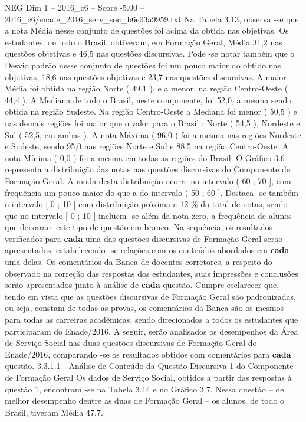 \begin{textsample}{NEG Dim 1 – 2016\_c6 – Score -5.00 – 2016\_c6/enade\_2016\_serv\_soc\_b6e03a9959.txt}
Na Tabela 3.13, observa -se que a nota Média nesse conjunto de questões foi acima da obtida nas objetivas.
Os estudantes, de todo o Brasil, obtiveram, em Formação Geral, Média 31,2 nas questões objetivas e 46,5 nas questões discursivas.
Pode -se notar também que o Desvio padrão nesse conjunto de questões foi um pouco maior do obtido nas objetivas, 18,6 nas questões objetivas e 23,7 nas questões discursivas.
A maior Média foi obtida na região Norte ( 49,1 ), e a menor, na região Centro-Oeste ( 44,4 ).
A Mediana de todo o Brasil, neste componente, foi 52,0, a mesma sendo obtida na região Sudeste.
Na região Centro-Oeste a Mediana foi menor ( 50,5 ) e nas demais regiões foi maior que o valor para o Brasil : Norte ( 54,5 ), Nordeste e Sul ( 52,5, em ambas ).
A nota Máxima ( 96,0 ) foi a mesma nas regiões Nordeste e Sudeste, sendo 95,0 nas regiões Norte e Sul e 88,5 na região Centro-Oeste.
A nota Mínima ( 0,0 ) foi a mesma em todas as regiões do Brasil.
O Gráfico 3.6 representa a distribuição das notas nas questões discursivas do Componente de Formação Geral.
A moda desta distribuição ocorre no intervalo ( 60 ; 70 ], com frequência um pouco maior do que a do intervalo ( 50 ; 60 ].
Destaca -se também o intervalo [ 0 ; 10 ] com distribuição próxima a 12 \% do total de notas, sendo que no intervalo [ 0 ; 10 ] incluem -se além da nota zero, a frequência de alunos que deixaram este tipo de questão em branco.
Na sequência, os resultados verificados para \textbf{cada} uma das questões discursivas de Formação Geral serão apresentados, estabelecendo -se relações com os conteúdos abordados em \textbf{cada} uma delas.
Os comentários da Banca de docentes corretores, a respeito do observado na correção das respostas dos estudantes, suas impressões e conclusões serão apresentados junto à análise de \textbf{cada} questão.
Cumpre esclarecer que, tendo em vista que as questões discursivas de Formação Geral são padronizadas, ou seja, constam de todas as provas, os comentários da Banca são os mesmos para todas as carreiras acadêmicas, sendo direcionados a todos os estudantes que participaram do Enade/2016.
A seguir, serão analisados os desempenhos da Área de Serviço Social nas duas questões discursivas de Formação Geral do Enade/2016, comparando -se os resultados obtidos com comentários para \textbf{cada} questão. 3.3.1.1 - Análise de Conteúdo da Questão Discursiva 1 do Componente de Formação Geral Os dados de Serviço Social, obtidos a partir das respostas à questão 1, encontram -se na Tabela 3.14 e no Gráfico 3.7.
Nessa questão – de melhor desempenho dentre as duas de Formação Geral – os alunos, de todo o Brasil, tiveram Média 47,7.

\end{textsample}
